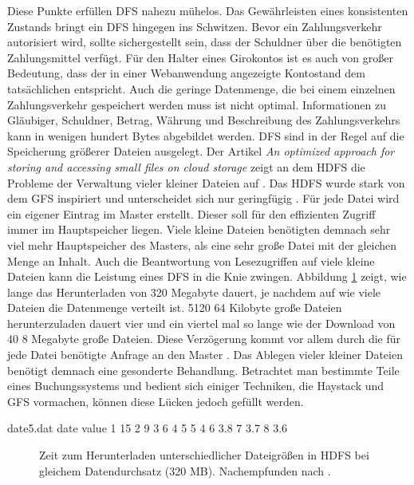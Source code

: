 \documentclass[12pt,oneside,a4paper,parskip]{scrbook}
\begin{document}
Diese Punkte erfüllen DFS nahezu mühelos. Das Gewährleisten eines konsistenten Zustands bringt ein DFS hingegen ins Schwitzen. Bevor ein Zahlungsverkehr autorisiert wird, sollte sichergestellt sein, dass der Schuldner über die benötigten Zahlungsmittel verfügt. Für den Halter eines Girokontos ist es auch von großer Bedeutung, dass der in einer Webanwendung angezeigte Kontostand dem tatsächlichen entspricht. Auch die geringe Datenmenge, die bei einem einzelnen Zahlungsverkehr gespeichert werden muss ist nicht optimal. Informationen zu Gläubiger, Schuldner, Betrag, Währung und Beschreibung des Zahlungsverkehrs kann in wenigen hundert Bytes abgebildet werden. DFS sind in der Regel auf die Speicherung größerer Dateien ausgelegt. Der Artikel \textit{An optimized approach for storing and accessing small files on cloud storage} zeigt an dem HDFS die Probleme der Verwaltung vieler kleiner Dateien auf \cite{hdfsSmallFiles}. Das HDFS wurde stark von dem GFS inspiriert und unterscheidet sich nur geringfügig \cite{hdfsGfs}. Für jede Datei wird ein eigener Eintrag im Master erstellt. Dieser soll für den effizienten Zugriff immer im Hauptspeicher liegen. Viele kleine Dateien benötigten demnach sehr viel mehr Hauptspeicher des Masters, als eine sehr große Datei mit der gleichen Menge an Inhalt. Auch die Beantwortung von Lesezugriffen auf viele kleine Dateien kann die Leistung eines DFS in die Knie zwingen. Abbildung \ref{hdfsSmallFiles} zeigt, wie lange das Herunterladen von 320 Megabyte dauert, je nachdem auf wie viele Dateien die Datenmenge verteilt ist. 5120 64 Kilobyte große Dateien herunterzuladen dauert vier und ein viertel mal so lange wie der Download von 40 8 Megabyte große Dateien. Diese Verzögerung kommt vor allem durch die für jede Datei benötigte Anfrage an den Master \cite{hdfsSmallFiles}. Das Ablegen vieler kleiner Dateien benötigt demnach eine gesonderte Behandlung. Betrachtet man bestimmte Teile eines Buchungssystems und bedient sich einiger Techniken, die Haystack und GFS vormachen, können diese Lücken jedoch gefüllt werden.



\begin{filecontents}{date5.dat}
date  value
1   15
2   9
3   6
4   5
5   4
6   3.8
7   3.7
8   3.6
\end{filecontents}


\begin{figure}
\begin{center}
\caption[Zeit zum Herunterladen unterschiedlicher Dateigrößen in HDFS]{Zeit zum Herunterladen unterschiedlicher Dateigrößen in HDFS bei gleichem Datendurchsatz (320 MB). Nachempfunden nach \cite{hdfsSmallFiles}.}
\label{hdfsSmallFiles}
\end{center}
\end{figure}
\end{document}
